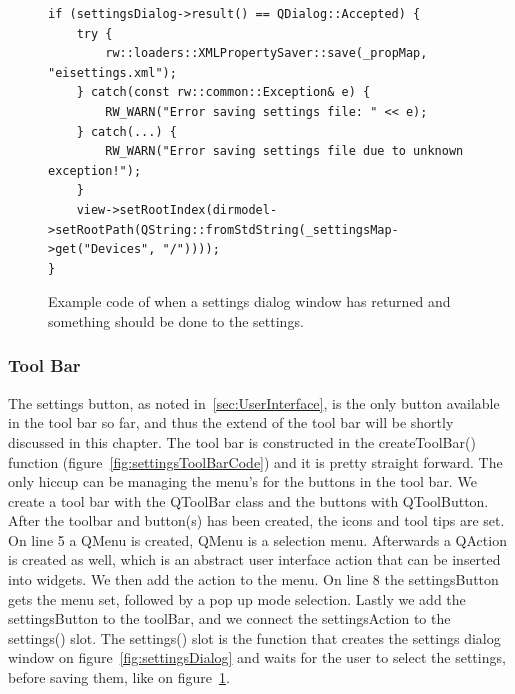 \begin{figure}[h] %
\centering
\lstset{language=C++} 
\begin{lstlisting}[frame=single]  
if (settingsDialog->result() == QDialog::Accepted) {
	try {
		rw::loaders::XMLPropertySaver::save(_propMap, "eisettings.xml");
	} catch(const rw::common::Exception& e) {
		RW_WARN("Error saving settings file: " << e);
	} catch(...) {
		RW_WARN("Error saving settings file due to unknown exception!");
	}
	view->setRootIndex(dirmodel->setRootPath(QString::fromStdString(_settingsMap->get("Devices", "/")))); 
}
\end{lstlisting}
\caption{Example code of when a settings dialog window has returned and something should be done to the settings.}
\label{fig:settingsCodeReturnDialog} 	
\end{figure}

\subsubsection{Tool Bar}
\label{sec:ToolBar}
The settings button, as noted in~\ref{sec:UserInterface}, is the only button available in the tool bar so far, and thus the extend of the tool bar will be shortly discussed in this chapter.
The tool bar is constructed in the createToolBar() function (figure~\ref{fig:settingsToolBarCode}) and it is pretty straight forward. The only hiccup can be managing the menu's for the buttons in the tool bar. We create a tool bar with the QToolBar class and the buttons with QToolButton. After the toolbar and button(s) has been created, the icons and tool tips are set. On line 5 a QMenu is created, QMenu is a selection menu. Afterwards a QAction is created as well, which is an abstract user interface action that can be inserted into widgets. We then add the action to the menu. On line 8 the settingsButton gets the menu set, followed by a pop up mode selection. Lastly we add the settingsButton to the toolBar, and we connect the settingsAction to the settings() slot. The settings() slot is the function that creates the settings dialog window on figure~\ref{fig:settingsDialog} and waits for the user to select the settings, before saving them, like on figure~\ref{fig:settingsCodeReturnDialog}.

